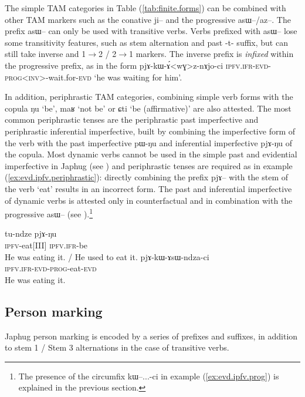 \documentclass[oldfontcommands,oneside,a4paper,11pt]{article}
\newcommand{\ipa}[1]{{\phon#1}} %
\newcommand{\refb}[1]{(\ref{#1})}
\begin{document}
The simple TAM categories in Table \refb{tab:finite.forms} can be combined with other TAM markers such as the conative \ipa{ji--} and the progressive \ipa{asɯ--}/\ipa{az--}. The prefix \ipa{asɯ--} can only be used with transitive verbs. Verbs prefixed with \ipa{asɯ--} lose some transitivity features, such as stem alternation and past \ipa{-t-} suffix, but can still take inverse and 1$\rightarrow$2 / 2$\rightarrow$1 markers. The inverse prefix is \textit{infixed} within the progressive prefix, as in the form \ipa{pjɤ-kɯ-ɤ́<wɣ>z-nɤjo-ci} \textsc{ipfv.ifr-evd-prog<inv>}-wait.for-\textsc{evd} `he was waiting for him'.

In addition, periphrastic TAM categories, combining simple verb forms with the copula \ipa{ŋu} `be', \ipa{maʁ} `not be' or \ipa{ɕti} `be (affirmative)' are also attested. The most common periphrastic tenses are the periphrastic past imperfective and periphrastic inferential imperfective, built by combining the imperfective form of the verb with the past imperfective \ipa{pɯ-ŋu} and inferential imperfective \ipa{pjɤ-ŋu} of the copula. Most dynamic verbs cannot be used in the simple past and evidential imperfective in Japhug (see \citealt{lin11direction}) and periphrastic tenses are required as in example \refb{ex:evd.ipfv.periphrastic}: directly combining the prefix \ipa{pjɤ--} with the stem of the verb `eat' results  in an incorrect form. The past and inferential imperfective of dynamic verbs is attested only in counterfactual and in combination with the progressive \ipa{asɯ--} (see \citealt[297-301]{jacques14linking}).\footnote{The presence of the circumfix \ipa{kɯ--...-ci} in example \refb{ex:evd.ipfv.prog} is explained in the previous section.}

\begin{exe}
\ex \label{ex:evd.ipfv.periphrastic}
\gll
\ipa{tu-ndze} \ipa{pjɤ-ŋu} \\
 \textsc{ipfv}-eat[III] \textsc{ipfv.ifr}-be \\
\glt He was eating it. / He used to eat it.
\ex \label{ex:evd.ipfv.prog}
\gll
 \ipa{pjɤ-kɯ-ɤsɯ-ndza-ci} \\
 \textsc{ipfv.ifr-evd-prog}-eat-\textsc{evd} \\
\glt He was eating it.
\end{exe}



\subsection{Person marking}
Japhug person marking is encoded by a series of prefixes and suffixes, in addition to stem 1 / Stem 3 alternations in the case of transitive verbs.
\end{document}
